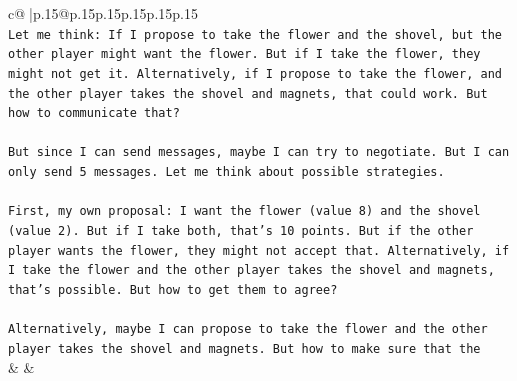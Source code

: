 \documentclass{article}
\begin{document}
{\begin{supertabular}{c@{$\;$}|p{.15\linewidth}@{}p{.15\linewidth}p{.15\linewidth}p{.15\linewidth}p{.15\linewidth}p{.15\linewidth}}
{{{\\ 
\texttt{Let me think: If I propose to take the flower and the shovel, but the other player might want the flower. But if I take the flower, they might not get it. Alternatively, if I propose to take the flower, and the other player takes the shovel and magnets, that could work. But how to communicate that?} \\
\\ 
\texttt{But since I can send messages, maybe I can try to negotiate. But I can only send 5 messages. Let me think about possible strategies.} \\
\\ 
\texttt{First, my own proposal: I want the flower (value 8) and the shovel (value 2). But if I take both, that's 10 points. But if the other player wants the flower, they might not accept that. Alternatively, if I take the flower and the other player takes the shovel and magnets, that's possible. But how to get them to agree?} \\
\\ 
\texttt{Alternatively, maybe I can propose to take the flower and the other player takes the shovel and magnets. But how to make sure that the} \\
            }
        }
    }
    & & \\ \\


\end{supertabular}}
\end{document}
